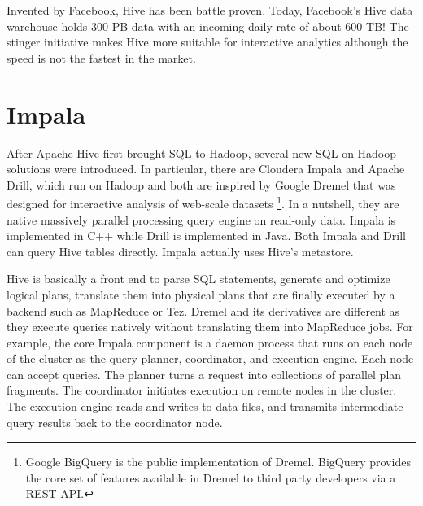 \documentclass[12pt]{book}
\begin{document}
Invented by Facebook, Hive has been battle proven. Today, Facebook's Hive data warehouse holds 300 PB data with an incoming daily rate of about 600 TB! The stinger initiative makes Hive more suitable for interactive analytics although the speed is not the fastest in the market.

\section{Impala}
After Apache Hive first brought SQL to Hadoop, several new SQL on Hadoop solutions were introduced. In particular, there are Cloudera Impala and Apache Drill, which run on Hadoop and both are inspired by Google Dremel that was designed for interactive analysis of web-scale datasets \footnote{Google BigQuery is the public implementation of Dremel. BigQuery provides the core set of features available in Dremel to third party developers via a REST API.}. In a nutshell, they are native massively parallel processing query engine on read-only data. Impala is implemented in C++ while Drill is implemented in Java. Both Impala and Drill can query Hive tables directly. Impala actually uses Hive's metastore.

Hive is basically a front end to parse SQL statements, generate and optimize logical plans, translate them into physical plans that are finally executed by a backend such as MapReduce or Tez. Dremel and its derivatives are different as they execute queries natively without translating them into MapReduce jobs. For example, the core Impala component is a daemon process that runs on each node of the cluster as the query planner, coordinator, and execution engine. Each node can accept queries. The planner turns a request into collections of parallel plan fragments. The coordinator initiates execution on remote nodes in the cluster. The execution engine reads and writes to data files, and transmits intermediate query results back to the coordinator node.
\end{document}
